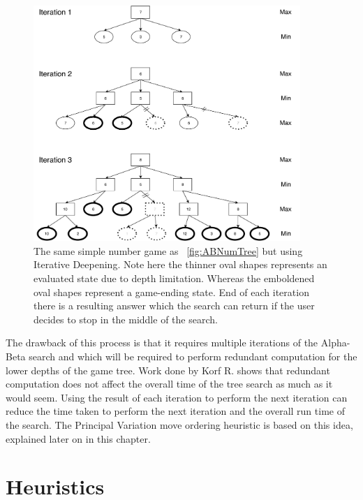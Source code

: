 \documentclass{l4proj}
\begin{document}
\begin{figure}[!ht]
\centering
\includegraphics[width=0.9\textwidth]{ABNumIDeep.pdf}

\caption{ The same simple number game as ~\autoref{fig:ABNumTree} but using Iterative Deepening. Note here the thinner oval shapes represents an evaluated state due to depth limitation. Whereas the emboldened oval shapes represent a game-ending state. End of each iteration there is a resulting answer which the search can return if the user decides to stop in the middle of the search.}
\label{fig:iter-deep}
\end{figure}


The drawback of this process is that it requires multiple iterations of the Alpha-Beta search and which will be required to perform redundant computation for the lower depths of the game tree. Work done by Korf R. \cite{Korf1985} shows that redundant computation does not affect the overall time of the tree search as much as it would seem. Using the result of each iteration to perform the next iteration can reduce the time taken to perform the next iteration and the overall run time of the search. The Principal Variation move ordering heuristic is based on this idea, explained later on in this chapter.




\section{Heuristics}
\end{document}
